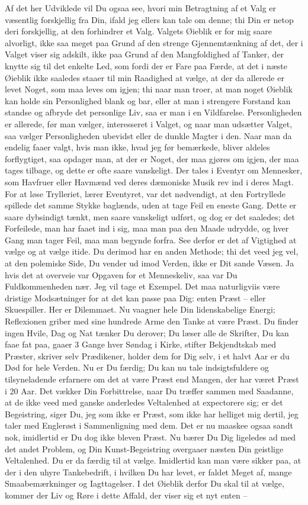 \documentclass[12pt,a4paper]{article}
\begin{document}
Af det her Udviklede vil Du ogsaa see, hvori min Betragtning af et Valg er væsentlig forskjellig fra Din, ifald jeg ellers kan tale om denne; thi Din er netop deri forskjellig, at den forhindrer et Valg. Valgets Øieblik er for mig saare alvorligt, ikke saa meget paa Grund af den strenge Gjennemtænkning af det, der i Valget viser sig adskilt, ikke paa Grund af den Mangfoldighed af Tanker, der knytte sig til det enkelte Led, som fordi der er Fare paa Færde, at det i næste Øieblik ikke saaledes staaer til min Raadighed at vælge, at der da allerede er levet Noget, som maa leves om igjen; thi naar man troer, at man noget Øieblik kan holde sin Personlighed blank og bar, eller at man i strengere Forstand kan standse og afbryde det personlige Liv, saa er man i en Vildfarelse. Personligheden er allerede, før man vælger, interesseret i Valget, og naar man udsætter Valget, saa vælger Personligheden ubevidst eller de dunkle Magter i den. Naar man da endelig faaer valgt, hvis man ikke, hvad jeg før bemærkede, bliver aldeles forflygtiget, saa opdager man, at der er Noget, der maa gjøres om igjen, der maa tages tilbage, og dette er ofte saare vanskeligt. Der tales i Eventyr om Mennesker, som Havfruer eller Havmænd ved deres dæmoniske Musik rev ind i deres Magt. For at løse Trylleriet, lærer Eventyret, var det nødvendigt, at den Fortryllede spillede det samme Stykke baglænds, uden at tage Feil en eneste Gang. Dette er saare dybsindigt tænkt, men saare vanskeligt udført, og dog er det saaledes; det Forfeilede, man har faaet ind i sig, maa man paa den Maade udrydde, og hver Gang man tager Feil, maa man begynde forfra. See derfor er det af Vigtighed at vælge og at vælge itide. Du derimod har en anden Methode; thi det veed jeg vel, at den polemiske Side, Du vender ud imod Verden, ikke er Dit sande Væsen. Ja hvis det at overveie var Opgaven for et Menneskeliv, saa var Du Fuldkommenheden nær. Jeg vil tage et Exempel. Det maa naturligviis være dristige Modsætninger for at det kan passe paa Dig: enten Præst – eller Skuespiller. Her er Dilemmaet. Nu vaagner hele Din lidenskabelige Energi; Reflexionen griber med sine hundrede Arme den Tanke at være Præst. Du finder ingen Hvile, Dag og Nat tænker Du derover; Du læser alle de Skrifter, Du kan faae fat paa, gaaer 3 Gange hver Søndag i Kirke, stifter Bekjendtskab med Præster, skriver selv Prædikener, holder dem for Dig selv, i et halvt Aar er du Død for hele Verden. Nu er Du færdig; Du kan nu tale indsigtsfuldere og tilsyneladende erfarnere om det at være Præst end Mangen, der har været Præst i 20 Aar. Det vækker Din Forbittrelse, naar Du træffer sammen med Saadanne, at de ikke veed med ganske anderledes Veltalenhed at expectorere sig; er det Begeistring, siger Du, jeg som ikke er Præst, som ikke har helliget mig dertil, jeg taler med Englerøst i Sammenligning med dem. Det er nu maaskee ogsaa sandt nok, imidlertid er Du dog ikke bleven Præst. Nu bærer Du Dig ligeledes ad med det andet Problem, og Din Kunst-Begeistring overgaaer næsten Din geistlige Veltalenhed. Du er da færdig til at vælge. Imidlertid kan man være sikker paa, at der i den uhyre Tankebedrift, i hvilken Du har levet, er faldet Meget af, mange Smaabemærkninger og Iagttagelser. I det Øieblik derfor Du skal til at vælge, kommer der Liv og Røre i dette Affald, der viser sig et nyt enten – 
\end{document}

